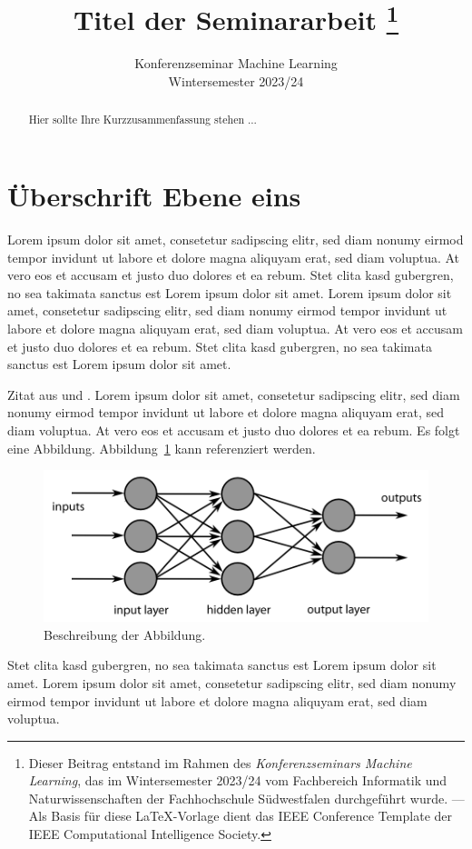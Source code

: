 \documentclass[a4paper, twoside]{IEEEtran}
\title{Titel der Seminararbeit
  \thanks{Dieser Beitrag entstand im Rahmen des \emph{Konferenzseminars Machine Learning}, das im Wintersemester 2023/24 vom Fachbereich Informatik und Naturwissenschaften der Fachhochschule Südwestfalen durchgeführt wurde. --- Als Basis für diese \LaTeX-Vorlage dient das IEEE Conference Template der IEEE Computational Intelligence Society.}}
\author{
  \IEEEauthorblockN{Ihr Name\\}
  \IEEEauthorblockA{Fachhochschule Südwestfalen}
  
  \vspace{3mm}
  Konferenzseminar Machine Learning\\
  Wintersemester 2023/24
}
\begin{document}
\maketitle

\begin{abstract}\null%
Hier sollte Ihre Kurzzusammenfassung stehen ... 
\end{abstract}

\section{Überschrift Ebene eins}

Lorem ipsum dolor sit amet, consetetur sadipscing elitr, sed diam nonumy eirmod tempor invidunt ut labore et dolore magna aliquyam erat, sed diam voluptua. At vero eos et accusam et justo duo dolores et ea rebum. Stet clita kasd gubergren, no sea takimata sanctus est Lorem ipsum dolor sit amet. Lorem ipsum dolor sit amet, consetetur sadipscing elitr, sed diam nonumy eirmod tempor invidunt ut labore et dolore magna aliquyam erat, sed diam voluptua. At vero eos et accusam et justo duo dolores et ea rebum. Stet clita kasd gubergren, no sea takimata sanctus est Lorem ipsum dolor sit amet.

Zitat aus \cite{scheme} und \cite[17]{knuth}. Lorem ipsum dolor sit amet, consetetur sadipscing elitr, sed diam nonumy eirmod tempor invidunt ut labore et dolore magna aliquyam erat, sed diam voluptua. At vero eos et accusam et justo duo dolores et ea rebum.
Es folgt eine Abbildung. Abbildung~\ref{abbildung1} kann referenziert werden.

\begin{figure}[htbp]
\centering
\includegraphics[width=\columnwidth]{deeplearning}
\caption{Beschreibung der Abbildung.}
\label{abbildung1}
\end{figure}

Stet clita kasd gubergren, no sea takimata sanctus est Lorem ipsum dolor sit amet. Lorem ipsum dolor sit amet, consetetur sadipscing elitr, sed diam nonumy eirmod tempor invidunt ut labore et dolore magna aliquyam erat, sed diam voluptua.
\end{document}
